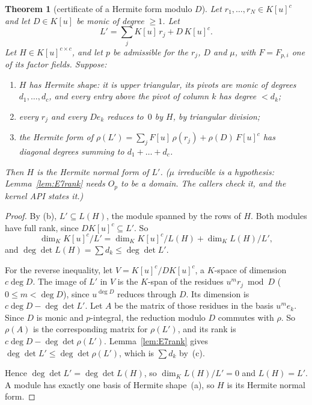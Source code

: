\documentclass[11pt]{article}
\newtheorem{theorem}{Theorem}[section]
\theoremstyle{definition}
\theoremstyle{remark}
\begin{document}
\begin{theorem}[certificate of a Hermite form modulo $D$]\label{thm:E7hnf}
Let $r_1,\dots,r_N\in K[u]^c$ and let $D\in K[u]$ be monic of degree $\ge1$. Let
\[
  L'=\sum_j K[u]\,r_j+D\,K[u]^c .
\]
Let $H\in K[u]^{c\times c}$, and let $p$ be admissible for the $r_j$, $D$ and
$\mu$, with $F=F_{p,i}$ one of its factor fields. Suppose:
\begin{enumerate}
\item[(a)] $H$ has Hermite shape: it is upper triangular, its pivots are monic of
  degrees $d_1,\dots,d_c$, and every entry above the pivot of column $k$ has degree
  $<d_k$;
\item[(b)] every $r_j$ and every $D e_k$ reduces to~$0$ by $H$, by triangular division;
\item[(c)] the Hermite form of $\rho(L')=\sum_j F[u]\,\rho(r_j)+\rho(D)\,F[u]^c$
  has diagonal degrees summing to $d_1+\dots+d_c$.
\end{enumerate}
Then $H$ is the Hermite normal form of $L'$. ($\mu$ irreducible is a hypothesis:
Lemma~\ref{lem:E7rank} needs $O_p$ to be a domain. The callers check it, and the
kernel API states it.)
\end{theorem}
\begin{proof}
By (b), $L'\subseteq L(H)$, the module spanned by the rows of $H$. Both modules
have full rank, since $D K[u]^c\subseteq L'$. So
\[
  \dim_K K[u]^c/L' = \dim_K K[u]^c/L(H) + \dim_K L(H)/L',
\]
and $\deg\det L(H)=\sum d_k\le\deg\det L'$.

For the reverse inequality, let $V=K[u]^c/DK[u]^c$, a $K$-space of dimension $c\deg D$.
The image of $L'$ in $V$ is the $K$-span of the residues $u^m r_j \bmod D$
($0\le m<\deg D$), since $u^{\deg D}$ reduces through $D$. Its dimension is
$c\deg D-\deg\det L'$. Let $A$ be the matrix of those residues in the basis
$u^m e_k$. Since $D$ is monic and $p$-integral, the reduction modulo $D$ commutes
with $\rho$. So $\rho(A)$ is the corresponding matrix for $\rho(L')$, and its rank is
$c\deg D-\deg\det\rho(L')$. Lemma~\ref{lem:E7rank} gives
$\deg\det L'\le\deg\det\rho(L')$, which is $\sum d_k$ by~(c).

Hence $\deg\det L'=\deg\det L(H)$, so $\dim_K L(H)/L'=0$ and $L(H)=L'$. A module has
exactly one basis of Hermite shape~(a), so $H$ is its Hermite normal form.
\end{proof}
\end{document}
